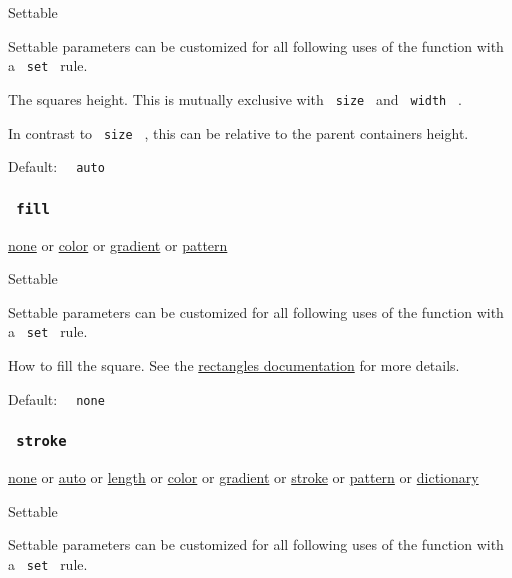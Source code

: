 {{ Settable }}

\label{parameters-height-settable-tooltip}
Settable parameters can be customized for all following uses of the
function with a \texttt{\ set\ } rule.

The square\textquotesingle s height. This is mutually exclusive with
\texttt{\ size\ } and \texttt{\ width\ } .

In contrast to \texttt{\ size\ } , this can be relative to the parent
container\textquotesingle s height.

Default: \texttt{\ }{\texttt{\ auto\ }}\texttt{\ }

\subsubsection{\texorpdfstring{\texttt{\ fill\ }}{ fill }}\label{parameters-fill}

\href{/docs/reference/foundations/none/}{none} {or}
\href{/docs/reference/visualize/color/}{color} {or}
\href{/docs/reference/visualize/gradient/}{gradient} {or}
\href{/docs/reference/visualize/pattern/}{pattern}

{{ Settable }}

\label{parameters-fill-settable-tooltip}
Settable parameters can be customized for all following uses of the
function with a \texttt{\ set\ } rule.

How to fill the square. See the
\href{/docs/reference/visualize/rect/\#parameters-fill}{rectangle\textquotesingle s
documentation} for more details.

Default: \texttt{\ }{\texttt{\ none\ }}\texttt{\ }

\subsubsection{\texorpdfstring{\texttt{\ stroke\ }}{ stroke }}\label{parameters-stroke}

\href{/docs/reference/foundations/none/}{none} {or}
\href{/docs/reference/foundations/auto/}{auto} {or}
\href{/docs/reference/layout/length/}{length} {or}
\href{/docs/reference/visualize/color/}{color} {or}
\href{/docs/reference/visualize/gradient/}{gradient} {or}
\href{/docs/reference/visualize/stroke/}{stroke} {or}
\href{/docs/reference/visualize/pattern/}{pattern} {or}
\href{/docs/reference/foundations/dictionary/}{dictionary}

{{ Settable }}

\label{parameters-stroke-settable-tooltip}
Settable parameters can be customized for all following uses of the
function with a \texttt{\ set\ } rule.

